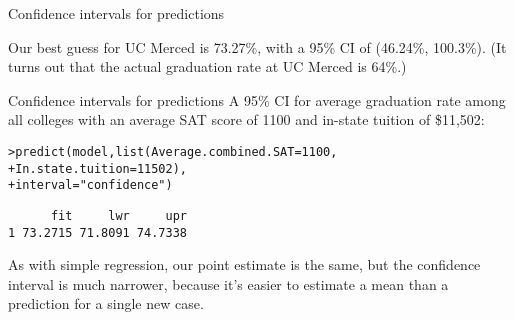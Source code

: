 \documentclass{beamer}\usepackage[]{graphicx}\usepackage[]{color}
\makeatletter
\newcommand{\hlnum}[1]{\textcolor[rgb]{0.824,0.412,0.118}{#1}}%
\newcommand{\hlstr}[1]{\textcolor[rgb]{1,0.894,0.71}{#1}}%
\newcommand{\hlstd}[1]{\textcolor[rgb]{1,0.894,0.769}{#1}}%
\newcommand{\hlkwc}[1]{\textcolor[rgb]{0.78,0.941,0.545}{#1}}%
\newcommand{\hlkwd}[1]{\textcolor[rgb]{1,0.78,0.769}{#1}}%
\newenvironment{kframe}{%
 \def\at@end@of@kframe{}%
 \ifinner\ifhmode%
  \def\at@end@of@kframe{\end{minipage}}%
  \begin{minipage}{\columnwidth}%
 \fi\fi%
 \def\FrameCommand##1{\hskip\@totalleftmargin \hskip-\fboxsep
 \colorbox{shadecolor}{##1}\hskip-\fboxsep
     \hskip-\linewidth \hskip-\@totalleftmargin \hskip\columnwidth}%
 \MakeFramed {\advance\hsize-\width
   \@totalleftmargin\z@ \linewidth\hsize
   \@setminipage}}%
 {\par\unskip\endMakeFramed%
 \at@end@of@kframe}
\newenvironment{knitrout}{}{} %
\makeatother
\begin{document}
\begin{darkframes}
\begin{frame}[fragile]{Confidence intervals for predictions}
      \pause

      Our best guess for UC Merced is 73.27\%, with a 95\% CI of (46.24\%, 100.3\%). \pause (It turns out that the actual graduation rate at UC Merced is 64\%.)
    \end{frame}

    \begin{frame}[fragile]{Confidence intervals for predictions}
      \fontsm
      A 95\% CI for average graduation rate among all colleges with an average SAT score of 1100 and in-state tuition of \$11,502:
      
\begin{knitrout}
\begin{kframe}
\begin{alltt}
\hlstd{> }\hlkwd{predict}\hlstd{(model,} \hlkwd{list}\hlstd{(}\hlkwc{Average.combined.SAT}\hlstd{=}\hlnum{1100}\hlstd{,}
\hlstd{+ }                    \hlkwc{In.state.tuition}\hlstd{=}\hlnum{11502}\hlstd{),}
\hlstd{+ }               \hlkwc{interval}\hlstd{=}\hlstr{"confidence"}\hlstd{)}
\end{alltt}
\begin{verbatim}
      fit     lwr     upr
1 73.2715 71.8091 74.7338
\end{verbatim}
\end{kframe}
\end{knitrout}

      \bigskip\pause

      As with simple regression, our point estimate is the same, but the confidence interval is much narrower, because it's easier to estimate a mean than a prediction for a single new case.
    \end{frame}
  \end{darkframes}
\end{document}
